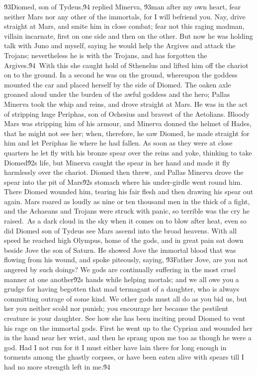 {\'93Diomed, son of Tydeus,\'94 replied Minerva, \'93man after my own heart, fear neither Mars nor any other of the immortals, for I will befriend you. Nay, drive straight at Mars, and smite him in close combat; fear not this raging madman, villain incarnate, first on one side and then on the other. But now he was holding talk with Juno and myself, saying he would help the Argives and attack the Trojans; nevertheless he is with the Trojans, and has forgotten the Argives.\'94\
With this she caught hold of Sthenelus and lifted him off the chariot on to the ground. In a second he was on the ground, whereupon the goddess mounted the car and placed herself by the side of Diomed. The oaken axle groaned aloud under the burden of the awful goddess and the hero; Pallas Minerva took the whip and reins, and drove straight at Mars. He was in the act of stripping huge Periphas, son of Ochesius and bravest of the Aetolians. Bloody Mars was stripping him of his armour, and Minerva donned the helmet of Hades, that he might not see her; when, therefore, he saw Diomed, he made straight for him and let Periphas lie where he had fallen. As soon as they were at close quarters he let fly with his bronze spear over the reins and yoke, thinking to take Diomed\'92s life, but Minerva caught the spear in her hand and made it fly harmlessly over the chariot. Diomed then threw, and Pallas Minerva drove the spear into the pit of Mars\'92s stomach where his under-girdle went round him. There Diomed wounded him, tearing his fair flesh and then drawing his spear out again. Mars roared as loudly as nine or ten thousand men in the thick of a fight, and the Achaeans and Trojans were struck with panic, so terrible was the cry he raised.\
As a dark cloud in the sky when it comes on to blow after heat, even so did Diomed son of Tydeus see Mars ascend into the broad heavens. With all speed he reached high Olympus, home of the gods, and in great pain sat down beside Jove the son of Saturn. He showed Jove the immortal blood that was flowing from his wound, and spoke piteously, saying, \'93Father Jove, are you not angered by such doings? We gods are continually suffering in the most cruel manner at one another\'92s hands while helping mortals; and we all owe you a grudge for having begotten that mad termagant of a daughter, who is always committing outrage of some kind. We other gods must all do as you bid us, but her you neither scold nor punish; you encourage her because the pestilent creature is your daughter. See how she has been inciting proud Diomed to vent his rage on the immortal gods. First he went up to the Cyprian and wounded her in the hand near her wrist, and then he sprang upon me too as though he were a god. Had I not run for it I must either have lain there for long enough in torments among the ghastly corpses, or have been eaten alive with spears till I had no more strength left in me.\'94\
}
